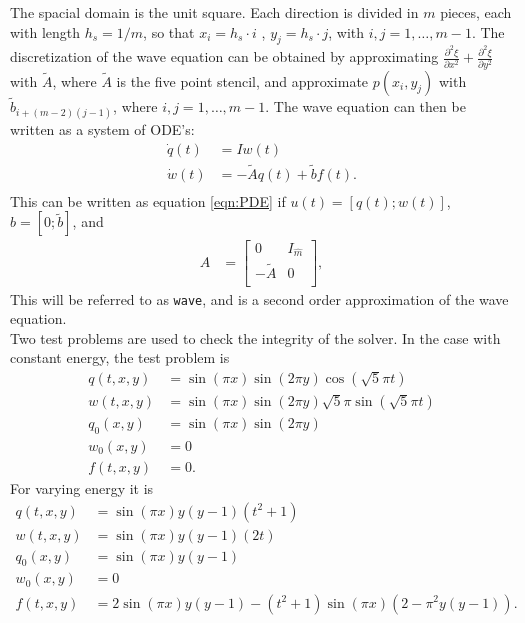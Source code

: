 \noindent The spacial domain is the unit square. Each direction is divided in $m$ pieces, each with length $h_s = 1/m$, so that $x_i  = h_s\cdot i$ , $y_j = h_s\cdot j$, with $i,j = 1,\dots,m-1$. 
\noindent The discretization of the wave equation can be obtained by approximating $\frac{\partial^2 \xi}{\partial x^2}+ \frac{\partial^2 \xi}{\partial y^2}$ with $\tilde{A}$, where $\tilde{A}$ is the five point stencil\cite{fivepoint}, and approximate $p(x_i,y_j)$ with $\tilde{b}_{i+(m-2)(j-1)}$, where $i,j = 1,\dots,m-1$. The wave equation can then be written as a system of ODE's:
\begin{equation*}
\begin{aligned}
\dot{q}(t) &= I w(t) \\
\dot{w}(t) & = -\tilde{A} q(t) + \tilde{b} f(t). \\
\end{aligned}
\end{equation*}
This can be written as equation \eqref{eqn:PDE} if $u(t) = [q(t);w(t)]$, $ b =[0; \tilde{b}] $, and
\begin{equation*}
\begin{aligned}
A &= 
\begin{bmatrix}
 0 & I_{\hat{m}} \\ - \tilde{A} & 0 \\
\end{bmatrix},
\end{aligned}
\end{equation*}
This will be referred to as \texttt{wave}, and is a second order approximation of the wave equation. \\

\noindent Two test problems are used to check the integrity of the solver. 
In the case with constant energy, the test problem is 
\begin{equation*}
\begin{aligned}
q(t,x,y) &= \sin(\pi x) \sin( 2 \pi y) \cos(\sqrt{5} \pi t) \\
w (t,x,y) &= \sin(\pi x) \sin( 2 \pi y) \sqrt{5} \pi \sin(\sqrt{5} \pi t) \\
q_0(x,y) &= \sin( \pi x) \sin(2 \pi y) \\
w_0(x,y) & = 0 \\
f(t,x,y) &= 0 .
\end{aligned}
\end{equation*}
For varying energy it is
\begin{equation*}
\begin{aligned}
q(t,x,y) &= \sin(\pi x) y (y-1) (t^2+1) \\
w(t,x,y) &= \sin(\pi x) y (y-1) (2 t) \\
q_0(x,y) &= \sin(\pi x) y (y-1) \\
w_0(x,y) & = 0 \\
f(t,x,y) & = 2  \sin(\pi x) y (y-1) -(t^2+1) \sin(\pi x) (2-\pi^2 y (y-1)).
\end{aligned}
\end{equation*}

